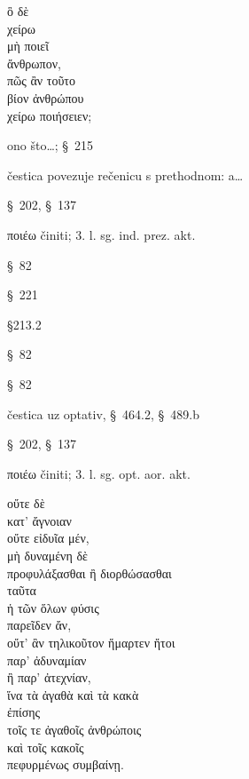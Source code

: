 
{\large
\begin{greek}
\noindent ὃ δὲ \\
χείρω \\
\tabto{2em} μὴ ποιεῖ \\
ἄνθρωπον, \\
πῶς ἂν τοῦτο \\
\tabto{2em} βίον ἀνθρώπου \\
\tabto{2em} χείρω ποιήσειεν;\\

\end{greek}
}

\begin{description}[noitemsep]
\item[ὃ] ono što\dots; §~215
\item[δὲ] čestica povezuje rečenicu s prethodnom: a\dots
\item[χείρω] §~202, §~137
\item[ποιεῖ] ποιέω činiti; 3. l. sg. ind. prez. akt.
\item[ἄνθρωπον] §~82
\item[πῶς] §~221
\item[τοῦτο] §213.2
\item[βίον] §~82
\item[ἀνθρώπου] §~82
\item[ἂν] čestica uz optativ, §~464.2, §~489.b
\item[χείρω] §~202, §~137
\item[ποιήσειεν] ποιέω činiti; 3. l. sg. opt. aor. akt.
\end{description}



{\large
\begin{greek}
\noindent οὔτε δὲ \\
\tabto{2em} κατ' ἄγνοιαν \\
\tabto{4em} οὔτε εἰδυῖα μέν, \\
\tabto{4em} μὴ δυναμένη δὲ \\
\tabto{6em} προφυλάξασθαι ἢ διορθώσασθαι \\
\tabto{8em} ταῦτα \\
\tabto{4em} ἡ τῶν ὅλων φύσις \\
\tabto{4em} παρεῖδεν ἄν, \\
\tabto{4em} οὔτ' ἂν τηλικοῦτον ἥμαρτεν ἤτοι \\
\tabto{6em} παρ' ἀδυναμίαν \\
\tabto{6em} ἢ παρ' ἀτεχνίαν, \\
\tabto{4em} ἵνα τὰ ἀγαθὰ καὶ τὰ κακὰ \\
\tabto{6em} ἐπίσης \\
\tabto{8em} τοῖς τε ἀγαθοῖς ἀνθρώποις \\
\tabto{8em} καὶ τοῖς κακοῖς \\
\tabto{6em} πεφυρμένως συμβαίνῃ.\\

\end{greek}
}

